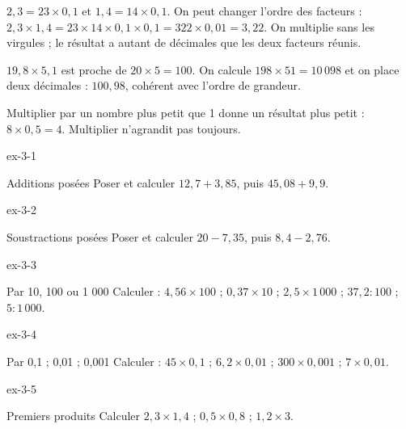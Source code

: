 \begin{propriete}$2{,}3=23\times0{,}1$ et $1{,}4=14\times0{,}1$. On peut changer l’ordre des facteurs : $2{,}3\times1{,}4=23\times14\times0{,}1\times0{,}1=322\times0{,}01=3{,}22$. On multiplie sans les virgules ; le résultat a autant de décimales que les deux facteurs réunis.\end{propriete}
\begin{savoirfaire}$19{,}8\times5{,}1$ est proche de $20\times5=100$. On calcule $198\times51=10\,098$ et on place deux décimales : $100{,}98$, cohérent avec l’ordre de grandeur.\end{savoirfaire}
\begin{attention}Multiplier par un nombre plus petit que 1 donne un résultat plus petit : $8\times0{,}5=4$. Multiplier n’agrandit pas toujours.\end{attention}

\clearpage{}
\begin{blocLivre}{ex-3-1}\begin{exercice}[1]{Additions posées}
Poser et calculer $12{,}7+3{,}85$, puis $45{,}08+9{,}9$.
\end{exercice}\end{blocLivre}
\begin{blocLivre}{ex-3-2}\begin{exercice}[1]{Soustractions posées}
Poser et calculer $20-7{,}35$, puis $8{,}4-2{,}76$.
\end{exercice}\end{blocLivre}
\begin{blocLivre}{ex-3-3}\begin{exercice}[1]{Par 10, 100 ou 1 000}
Calculer : $4{,}56\times100$ ; $0{,}37\times10$ ; $2{,}5\times1\,000$ ; $37{,}2:100$ ; $5:1\,000$.
\end{exercice}\end{blocLivre}
\begin{blocLivre}{ex-3-4}\begin{exercice}[1]{Par 0,1 ; 0,01 ; 0,001}
Calculer : $45\times0{,}1$ ; $6{,}2\times0{,}01$ ; $300\times0{,}001$ ; $7\times0{,}01$.
\end{exercice}\end{blocLivre}
\begin{blocLivre}{ex-3-5}\begin{exercice}[1]{Premiers produits}
Calculer $2{,}3\times1{,}4$ ; $0{,}5\times0{,}8$ ; $1{,}2\times3$.
\end{exercice}\end{blocLivre}

